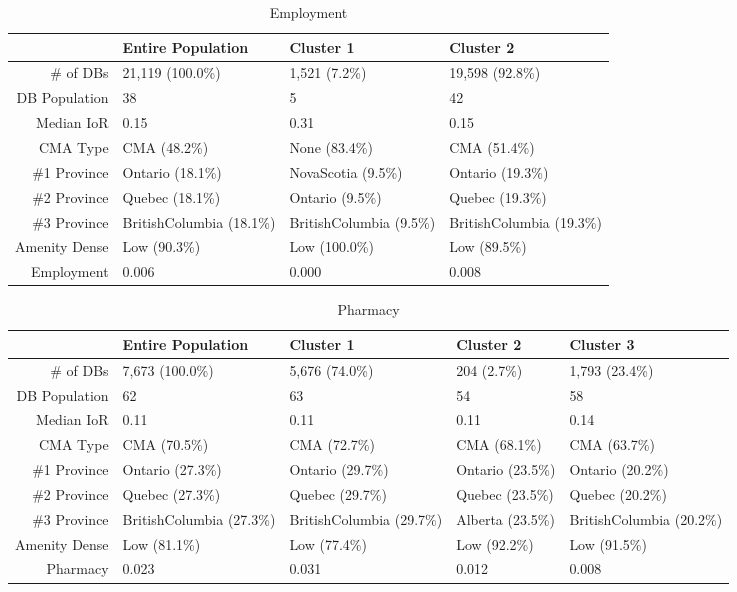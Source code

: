 \documentclass[11pt, a4paper]{article}
\begin{document}
 

\begin{sidewaystable}[ht]
\centering
\begin{tabular}{rlll}
  \hline
 & Entire Population & Cluster 1 & Cluster 2 \\ 
  \hline
\# of DBs & 21,119 (100.0\%) & 1,521 (7.2\%) & 19,598 (92.8\%) \\ 
  DB Population & 38 & 5 & 42 \\ 
  Median IoR & 0.15 & 0.31 & 0.15 \\ 
  CMA Type & CMA (48.2\%) & None (83.4\%) & CMA (51.4\%) \\ 
  \#1 Province & Ontario (18.1\%) & NovaScotia (9.5\%) & Ontario (19.3\%) \\ 
  \#2 Province & Quebec (18.1\%) & Ontario (9.5\%) & Quebec (19.3\%) \\ 
  \#3 Province & BritishColumbia (18.1\%) & BritishColumbia (9.5\%) & BritishColumbia (19.3\%) \\ 
  Amenity Dense & Low (90.3\%) & Low (100.0\%) & Low (89.5\%) \\ 
  Employment & 0.006 & 0.000 & 0.008 \\ 
   \hline
\end{tabular}
\caption{Employment} 
\end{sidewaystable}





 \pagebreak 
 
\begin{sidewaystable}[ht]
\centering
\begin{tabular}{rllll}
  \hline
 & Entire Population & Cluster 1 & Cluster 2 & Cluster 3 \\ 
  \hline
\# of DBs & 7,673 (100.0\%) & 5,676 (74.0\%) & 204 (2.7\%) & 1,793 (23.4\%) \\ 
  DB Population & 62 & 63 & 54 & 58 \\ 
  Median IoR & 0.11 & 0.11 & 0.11 & 0.14 \\ 
  CMA Type & CMA (70.5\%) & CMA (72.7\%) & CMA (68.1\%) & CMA (63.7\%) \\ 
  \#1 Province & Ontario (27.3\%) & Ontario (29.7\%) & Ontario (23.5\%) & Ontario (20.2\%) \\ 
  \#2 Province & Quebec (27.3\%) & Quebec (29.7\%) & Quebec (23.5\%) & Quebec (20.2\%) \\ 
  \#3 Province & BritishColumbia (27.3\%) & BritishColumbia (29.7\%) & Alberta (23.5\%) & BritishColumbia (20.2\%) \\ 
  Amenity Dense & Low (81.1\%) & Low (77.4\%) & Low (92.2\%) & Low (91.5\%) \\ 
  Pharmacy & 0.023 & 0.031 & 0.012 & 0.008 \\ 
   \hline
\end{tabular}
\caption{Pharmacy} 
\end{sidewaystable}
\end{document}
